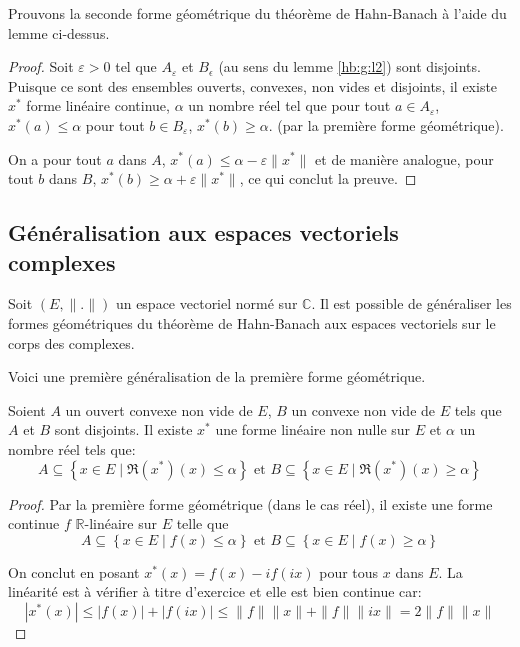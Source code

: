 Prouvons la seconde forme géométrique du théorème de Hahn-Banach à l'aide
du lemme ci-dessus.

\begin{proof}
  Soit $\varepsilon> 0 $ tel que $A_\varepsilon$ et $B_\epsilon$ (au sens du
  lemme \ref{hb:g:l2}) sont disjoints. Puisque ce sont des ensembles ouverts,
  convexes, non vides et disjoints, il existe $x^*$ forme linéaire continue,
  $\alpha$ un nombre réel tel que pour tout $a\in A_\varepsilon$,
  $x^*(a)\leq\alpha$ pour tout $b\in B_\varepsilon$, $x^*(b)\geq \alpha$.
  (par la première forme géométrique).

  On a pour tout $a$ dans $A$, $x^*(a)\leq \alpha - \varepsilon\|x^*\|$ et
  de manière analogue,
  pour tout $b$ dans $B$, $x^*(b)\geq \alpha +\varepsilon \|x^*\|$, ce qui
  conclut la preuve.

\end{proof}

\subsection{Généralisation aux espaces vectoriels complexes}
Soit $(E, \|.\|)$ un espace vectoriel normé sur $\mathbb{C}$. Il est
possible de généraliser les formes géométriques du théorème de Hahn-Banach
aux espaces vectoriels sur le corps des complexes.


Voici une première généralisation de la première forme géométrique.
\begin{thm}\label{hb:g:c1}
  Soient $A$ un ouvert convexe non vide de $E$, $B$ un
  convexe non vide de $E$ tels que $A$ et $B$ sont disjoints. Il existe
  $x^*$ une forme linéaire non nulle sur $E$ et $\alpha$ un nombre réel tels que:
  $$A\subseteq \left\{x\in E\mid \Re(x^*)(x) \leq \alpha\right\} \mbox{ et }
  B\subseteq \left\{x\in E\mid \Re(x^*)(x) \geq \alpha\right\} $$
\end{thm}

\begin{proof}
  Par la première forme géométrique (dans le cas réel), il existe une forme continue $f$
  $\mathbb{R}$-linéaire sur $E$ telle que
  $$A\subseteq \left\{x\in E\mid f(x) \leq \alpha\right\} \mbox{ et }
  B\subseteq \left\{x\in E\mid f(x) \geq \alpha\right\} $$

  On conclut en posant $x^*(x) = f(x) - if(ix)$ pour tous $x$ dans $E$.
  La linéarité est à vérifier à titre d'exercice et
  elle est bien continue car: $$|x^*(x)|\leq |f(x)|+|f(ix)|\leq
  \|f\|\|x\|+\|f\|\|ix\| = 2 \|f\|\|x\|$$
\end{proof}

